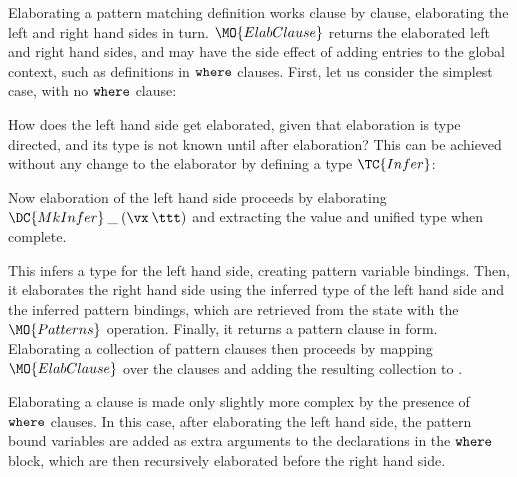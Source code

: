 Elaborating a pattern matching definition works clause by clause, elaborating
the left and right hand sides in turn. $\MO{ElabClause}$ returns the elaborated
left and right hand sides, and may have the side effect of adding entries
to the global context, such as definitions in $\mathtt{where}$ clauses.
First, let us consider the simplest case, with no $\mathtt{where}$ clause:


How does the left hand side get elaborated, given that elaboration is type directed, and
its type is not known until after elaboration? 
This can be achieved without any change to the elaborator by defining 
a type $\TC{Infer}$:


Now elaboration of the left hand side proceeds by elaborating $\DC{MkInfer}\:\_\:(\vx\:\ttt)$ and
extracting the value and unified type when complete.


This infers a type for the left hand side, creating pattern variable bindings. Then, 
it elaborates the right hand side using the inferred type of the left hand side
and the inferred pattern bindings, which are retrieved from the state with the
$\MO{Patterns}$ operation. Finally, it returns a pattern clause in \TT{} form.
Elaborating a collection of pattern clauses then proceeds by mapping $\MO{ElabClause}$ over
the clauses and adding the resulting collection to \TT{}.


Elaborating a clause is made only slightly more complex by the presence of
$\mathtt{where}$ clauses. In this case, after elaborating the left hand side, the pattern
bound variables are added as extra arguments to the declarations in the $\mathtt{where}$ block,
which are then recursively elaborated before the right hand side.

